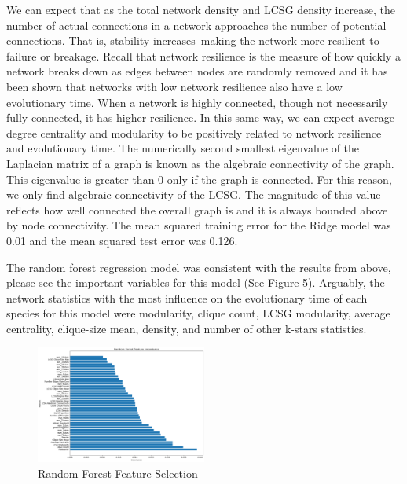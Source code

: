 \documentclass[12pt]{article}
\begin{document}
\indent We can expect that as the total network density and LCSG density increase, the number of actual connections in a network approaches the number of potential connections. That is, stability increases--making the network more resilient to failure or breakage. Recall that network resilience is the measure of how quickly a network breaks down as edges between nodes are randomly removed and it has been shown that networks with low network resilience also have a low evolutionary time. When a network is highly connected, though not necessarily fully connected, it has higher resilience. In this same way, we can expect average degree centrality and modularity to be positively related to network resilience and evolutionary time. The numerically second smallest eigenvalue of the Laplacian matrix of a graph is known as the algebraic connectivity of the graph. This eigenvalue is greater than 0 only if the graph is connected. For this reason, we only find algebraic connectivity of the LCSG. The magnitude of this value reflects how well connected the overall graph is and it is always bounded above by node connectivity. The mean squared training error for the Ridge model was 0.01 and the mean squared test error was 0.126. 

The random forest regression model was consistent with the results from above, please see the important variables for this model (See Figure 5). Arguably, the network statistics with the most influence on the evolutionary time of each species for this model were modularity, clique count, LCSG modularity, average centrality, clique-size mean, density, and number of other k-stars statistics. 
\begin{figure}
  \vspace{-20pt}
  \begin{center}
    \includegraphics[width=0.5\textwidth]{PPIN_fig2}
  \end{center}
  \vspace{-20pt}
  \caption{Random Forest Feature Selection}
  \vspace{-10pt}
\end{figure}
\end{document}
